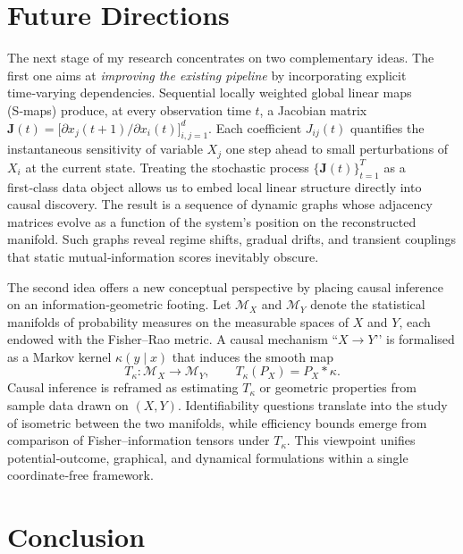 \documentclass[14pt]{extarticle}
\begin{document}
	\section{Future Directions} \label{sec:future}
	
	The next stage of my research concentrates on two complementary ideas.  
	The first one aims at \emph{improving the existing pipeline} by incorporating explicit time‑varying dependencies.  
	Sequential locally weighted global linear maps (S‑maps) produce, at every observation time $t$, a Jacobian matrix $\mathbf J(t)=\bigl[\partial x_j(t+1)\!/\!\partial x_i(t)\bigr]_{i,j=1}^{d}$.  
	Each coefficient $J_{ij}(t)$ quantifies the instantaneous sensitivity of variable $X_j$ one step ahead to small perturbations of $X_i$ at the current state.  
	Treating the stochastic process $\{\mathbf J(t)\}_{t=1}^{T}$ as a first‑class data object allows us to embed local linear structure directly into causal discovery.   
	The result is a sequence of dynamic graphs whose adjacency matrices evolve as a function of the system’s position on the reconstructed manifold.  
	Such graphs reveal regime shifts, gradual drifts, and transient couplings that static mutual‑information scores inevitably obscure.  
	
	The second idea offers a new conceptual perspective by placing causal inference on an information‑geometric footing.  
	Let $\mathcal M_X$ and $\mathcal M_Y$ denote the statistical manifolds of probability measures on the measurable spaces of $X$ and $Y$, each endowed with the Fisher–Rao metric.  
	A causal mechanism “$X\!\rightarrow\!Y$’’ is formalised as a Markov kernel $\kappa(y\!\mid\!x)$ that induces the smooth map
	$$
	T_\kappa:\mathcal M_X\longrightarrow\mathcal M_Y,\qquad T_\kappa(P_X)=P_X\ast\kappa.
	$$
	Causal inference is reframed as estimating $T_\kappa$ or geometric properties from sample data drawn on $(X,Y)$.  
	Identifiability questions translate into the study of isometric between the two manifolds, while efficiency bounds emerge from comparison of Fisher–information tensors under $T_\kappa$.  
	This viewpoint unifies potential‑outcome, graphical, and dynamical formulations within a single coordinate‑free framework.  
	
	\section{Conclusion} \label{sec:conclusion}
	
\end{document}
